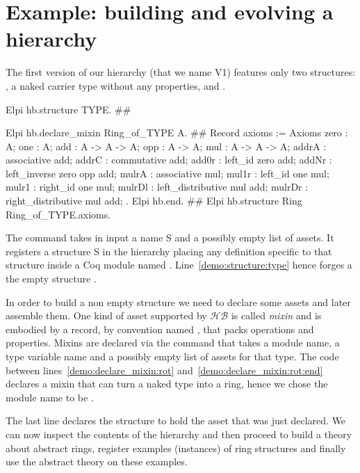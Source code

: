 \documentclass[a4paper,UKenglish,cleveref, autoref]{lipics-v2019}
\newcommand{\HB}{\ensuremath{\mathcal{HB}}}
\begin{document}
\section{Example: building and evolving a hierarchy}

The first version of our hierarchy (that we name V1) features only two
structures: , a naked carrier type without any properties, and
.

\begin{coqcode}
Elpi hb.structure TYPE.                            #\label{demo:structure:type}#

Elpi hb.declare_mixin Ring_of_TYPE A.           #\label{demo:declare_mixin:rot}#
  Record axioms := Axioms {
    zero : A;
    one : A;
    add : A -> A -> A;
    opp : A -> A;
    mul : A -> A -> A;
    addrA : associative add;
    addrC : commutative add;
    add0r : left_id zero add;
    addNr : left_inverse zero opp add;
    mulrA : associative mul;
    mul1r : left_id one mul;
    mulr1 : right_id one mul;
    mulrDl : left_distributive mul add;
    mulrDr : right_distributive mul add;
  }.
Elpi hb.end.                                #\label{demo:declare_mixin:rot:end}#
Elpi hb.structure Ring Ring_of_TYPE.axioms.
\end{coqcode}

The  command takes in input a name S and a possibly
empty list of assets. It registers a structure S in the hierarchy placing
any definition specific to that structure inside a Coq module named .
Line~\ref{demo:structure:type} hence forges a the empty structure .

In order to build a non empty structure we need to declare some assets and
later assemble them. One kind of asset supported by \HB{} is called
\emph{mixin} and is embodied by a record, by convention named ,
that packs operations and properties.
Mixins are declared via the  command
that takes a module name,
a type variable name and a possibly empty list of assets for that type.
The code between lines~\ref{demo:declare_mixin:rot}
and~\ref{demo:declare_mixin:rot:end} declares a mixin that can turn a naked
type into a ring, hence we chose the module name to be .

The last line declares the structure  to hold the asset that
was just declared. We can now inspect the contents of the hierarchy and then
proceed to build a theory about abstract rings,
register examples (instances) of ring structures
and finally use the abstract theory on these examples.
\end{document}
